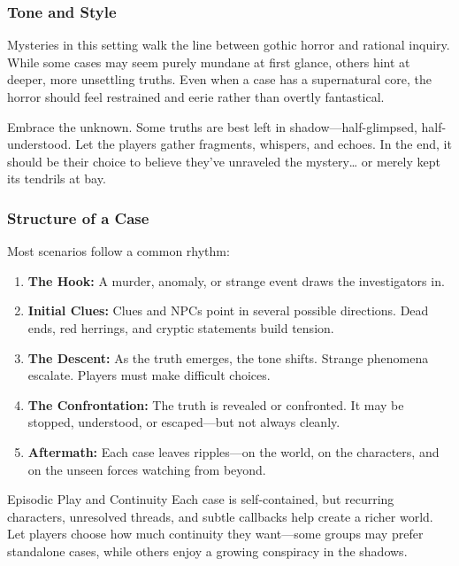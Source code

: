 \subsubsection*{Tone and Style}

Mysteries in this setting walk the line between gothic horror and rational inquiry. While some cases may seem purely mundane at first glance, others hint at deeper, more unsettling truths. Even when a case has a supernatural core, the horror should feel restrained and eerie rather than overtly fantastical.

Embrace the unknown. Some truths are best left in shadow—half-glimpsed, half-understood. Let the players gather fragments, whispers, and echoes. In the end, it should be their choice to believe they’ve unraveled the mystery… or merely kept its tendrils at bay.


\subsubsection*{Structure of a Case}

Most scenarios follow a common rhythm:

\begin{enumerate}
    \item \textbf{The Hook:} A murder, anomaly, or strange event draws the investigators in.
    \item \textbf{Initial Clues:} Clues and NPCs point in several possible directions. Dead ends, red herrings, and cryptic statements build tension.
    \item \textbf{The Descent:} As the truth emerges, the tone shifts. Strange phenomena escalate. Players must make difficult choices.
    \item \textbf{The Confrontation:} The truth is revealed or confronted. It may be stopped, understood, or escaped—but not always cleanly.
    \item \textbf{Aftermath:} Each case leaves ripples—on the world, on the characters, and on the unseen forces watching from beyond.
\end{enumerate}

\begin{CommentBox}{Episodic Play and Continuity}
    Each case is self-contained, but recurring characters, unresolved threads, and subtle callbacks help create a richer world. Let players choose how much continuity they want—some groups may prefer standalone cases, while others enjoy a growing conspiracy in the shadows.
\end{CommentBox}

